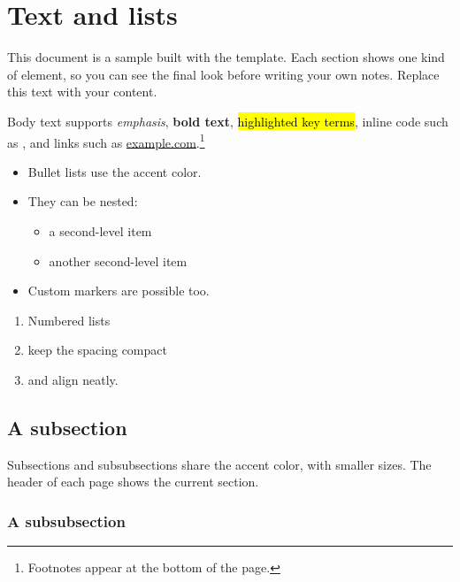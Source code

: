 \section{Text and lists}\label{sec:text}

This document is a sample built with the template. Each section shows one
kind of element, so you can see the final look before writing your own notes.
Replace this text with your content.

Body text supports \emph{emphasis}, \textbf{bold text},
\hl{highlighted key terms}, inline code such as ,
and links such as \href{https://example.com}{example.com}.\footnote{Footnotes
appear at the bottom of the page.}

\begin{itemize}
  \item Bullet lists use the accent color.
  \item They can be nested:
  \begin{itemize}
    \item a second-level item
    \item another second-level item
  \end{itemize}
  \item[\textcolor{co-green}{\checkmark}] Custom markers are possible too.
\end{itemize}

\begin{enumerate}
  \item Numbered lists
  \item keep the spacing compact
  \item and align neatly.
\end{enumerate}

\subsection{A subsection}

Subsections and subsubsections share the accent color, with smaller sizes.
The header of each page shows the current section.

\subsubsection{A subsubsection}

